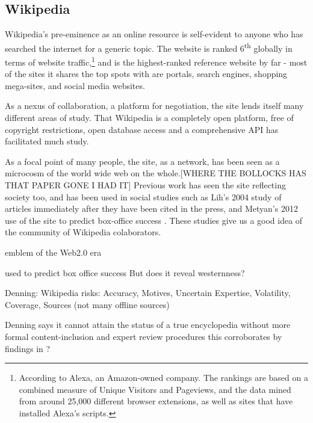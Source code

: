 \documentclass[a4paper,11pt,twoside,notitlepage]{article}
\newcommand{\super}[1]{\textsuperscript{#1}}
\begin{document}
        \subsection{Wikipedia}
        Wikipedia's pre-eminence as an online resource is self-evident
        to anyone who has searched the internet for a generic
        topic. The website is ranked 6\super{th} globally in terms of
        website traffic,\footnote{According to Alexa, an Amazon-owned
        company. The rankings are based on a combined measure of
        Unique Visitors and Pageviews, and the data mined from around
        25,000 different browser extensions, as well as sites that
        have installed Alexa's scripts.\cite{Alexa-about2014}} and
        is the highest-ranked reference website by far - most of the
        sites it shares the top spots with are portals, search
        engines, shopping mega-sites, and social media
        websites.\cite{Alexa-topsites2014}

        As a nexus of collaboration, a platform for negotiation,
        the site lends itself many different areas of study. That
        Wikipedia is a completely open platform, free of copyright
        restrictions, open database access and a comprehensive API
        has facilitated much study. 

        As a focal point of many people, the site, as a network, has
        been seen as a microcosm of the world wide web on the
        whole.[WHERE THE BOLLOCKS HAS THAT PAPER GONE I HAD IT]
        Previous work has seen the site reflecting society too, and
        has been used in social studies such as Lih's 2004 study of
        articles immediately after they have been cited in the
        press\cite{Lih2004}, and Metyan's 2012 use of the site to
        predict box-office success \cite{Mestyan2012}. These studies
        give us a good idea of the community of Wikipedia
        colaborators. 

        emblem of the Web2.0 era \cite{Mesgari2014}

        used to predict box office success \cite{Mestyan2012} But does
        it reveal westernness?

        Denning: Wikipedia risks: Accuracy, Motives, Uncertain Expertise,
        Volatility, Coverage, Sources (not many offline sources)
        \cite{Denning2005} 

        Denning says it cannot attain the status of a true
        encyclopedia without more formal content-inclusion and expert
        review procedures\cite{Denning2005} this corroborates by
        findings in \cite{Giles2005}?
\end{document}
